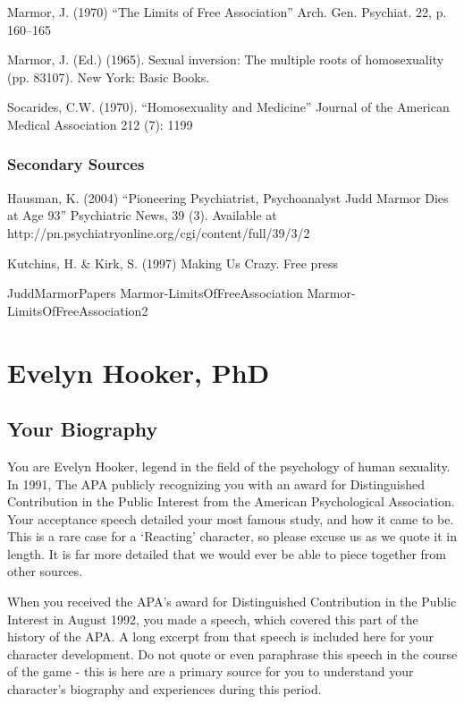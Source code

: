 Marmor, J. (1970) ``The Limits of Free Association'' Arch. Gen. Psychiat. 22, p. 160--165

Marmor, J. (Ed.) (1965). Sexual inversion: The multiple roots of homosexuality (pp. 83107). New York: Basic Books.

Socarides, C.W. (1970). ``Homosexuality and Medicine'' Journal of the American Medical Association 212 (7): 1199

\subsection{Secondary Sources}
\label{secondarysources}

Hausman, K. (2004) ``Pioneering Psychiatrist, Psychoanalyst Judd Marmor Dies at Age 93'' Psychiatric News, 39 (3). Available at http:\slash \slash pn.psychiatryonline.org\slash cgi\slash content\slash full\slash 39\slash 3\slash 2

Kutchins, H. \& Kirk, S. (1997) Making Us Crazy. Free press

JuddMarmorPapers
Marmor-LimitsOfFreeAssociation
Marmor-LimitsOfFreeAssociation2

\chapter{Evelyn Hooker, PhD}
\label{evelynhookerphd}

\section{Your Biography}
\label{yourbiography}

You are Evelyn Hooker, legend in the field of the psychology of human sexuality. In 1991, The APA publicly recognizing you with an award for Distinguished Contribution in the Public Interest from the American Psychological Association. Your acceptance speech detailed your most famous study, and how it came to be. This is a rare case for a `Reacting' character, so please excuse us as we quote it in length. It is far more detailed that we would ever be able to piece together from other sources.

When you received the APA's award for Distinguished Contribution in the Public Interest in August 1992, you made a speech, which covered this part of the history of the APA. A long excerpt from that speech is included here for your character development. Do not quote or even paraphrase this speech in the course of the game - this is here are a primary source for you to understand your character's biography and experiences during this period.

